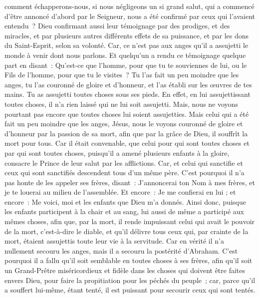 \begin{multicols}{2}
comment échapperons-nous, si nous négligeons un si grand salut, qui a commencé d'être annoncé d'abord par le Seigneur, nous a été confirmé par ceux qui l'avaient entendu~?
Dieu confirmant aussi leur témoignage par des prodiges, et des miracles, et par plusieurs autres différents effets de sa puissance, et par les dons du Saint-Esprit, selon sa volonté.
Car, ce n'est pas aux anges qu'il a assujetti le monde à venir dont nous parlons.
Et quelqu'un a rendu ce témoignage quelque part en disant~: Qu'est-ce que l'homme, pour que tu te souviennes de lui, ou le Fils de l'homme, pour que tu le visites~?
Tu l'as fait un peu moindre que les anges, tu l'as couronné de gloire et d'honneur, et l'as établi sur les œuvres de tes mains.
Tu as assujetti toutes choses sous ses pieds. En effet, en lui assujettissant toutes choses, il n'a rien laissé qui ne lui soit assujetti. Mais, nous ne voyons pourtant pas encore que toutes choses lui soient assujetties.
Mais celui qui a été fait un peu moindre que les anges, Jésus, nous le voyons couronné de gloire et d'honneur par la passion de sa mort, afin que par la grâce de Dieu, il souffrît la mort pour tous.
Car il était convenable, que celui pour qui sont toutes choses et par qui sont toutes choses, puisqu'il a amené plusieurs enfants à la gloire, consacre le Prince de leur salut par les afflictions.
Car, et celui qui sanctifie et ceux qui sont sanctifiés descendent tous d'un même père. C'est pourquoi il n'a pas honte de les appeler ses frères,
disant~: J'annoncerai ton Nom à mes frères, et je te louerai au milieu de l'assemblée.
Et encore~: Je me confierai en lui ; et encore~: Me voici, moi et les enfants que Dieu m'a donnés.
Ainsi donc, puisque les enfants participent à la chair et au sang, lui aussi de même a participé aux mêmes choses, afin que, par la mort, il rende impuissant celui qui avait le pouvoir de la mort, c'est-à-dire le diable,
et qu'il délivre tous ceux qui, par crainte de la mort, étaient assujettis toute leur vie à la servitude.
Car en vérité il n'a nullement secouru les anges, mais il a secouru la postérité d'Abraham.
C'est pourquoi il a fallu qu'il soit semblable en toutes choses à ses frères, afin qu'il soit un Grand-Prêtre miséricordieux et fidèle dans les choses qui doivent être faites envers Dieu, pour faire la propitiation pour les péchés du peuple~;
car, parce qu'il a souffert lui-même, étant tenté, il est puissant pour secourir ceux qui sont tentés.

\end{multicols}
